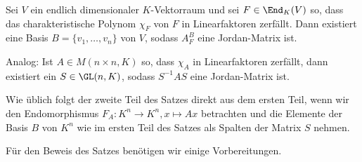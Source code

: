 \begin{satz}
	\label{satz:9.6}
	Sei $V$ ein endlich dimensionaler $K$-Vektorraum und sei $F \in \End_K(V)$ so, dass das charakteristische Polynom $\chi_F$ von $F$ in Linearfaktoren zerfällt.
	Dann existiert eine Basis $B = \{v_1,\dots,v_n\}$ von $V$, sodass $A_F^B$ eine Jordan-Matrix ist.
	
	Analog: Ist $A \in M(n \times n, K)$ so, dass $\chi_A$ in Linearfaktoren zerfällt, dann existiert ein $S \in \GL(n,K)$, sodass $S^{-1}AS$ eine Jordan-Matrix ist.
\end{satz}

Wie üblich folgt der zweite Teil des Satzes direkt aus dem ersten Teil, wenn wir den Endomorphismus $F_A \colon K^n \rightarrow K^n, x \mapsto Ax$ betrachten und die Elemente der Basis $B$ von $K^n$ wie im ersten Teil des Satzes als Spalten der Matrix $S$ nehmen.

Für den Beweis des Satzes benötigen wir einige Vorbereitungen.


